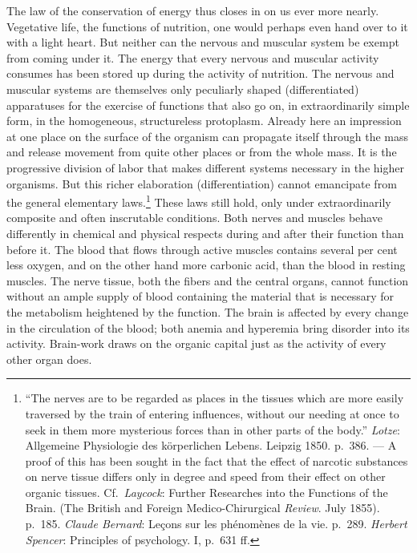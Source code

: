 \documentclass[12pt,a4paper]{book}
\newcommand{\opage}[1]{\marginnote{\footnotesize\textit{[#1]}}}
\begin{document}
The law of the conservation of energy thus closes in on us ever more
nearly. Vegetative life, the functions of nutrition, one would perhaps
even hand over to it with a light heart. But neither can the nervous and
muscular system be exempt from coming under it. The energy that every
nervous and muscular activity consumes has been stored up during the
activity of nutrition. The nervous and muscular systems are themselves
only peculiarly shaped (differentiated) apparatuses for the exercise of
functions that also go on, in extraordinarily simple form, in the
homogeneous, structureless protoplasm. Already here an impression at
one place on the surface of the organism can propagate itself through
the mass and release movement from quite other places or from the whole
mass. It is the progressive division of labor that makes different
systems necessary in the higher organisms. But this richer elaboration
(differentiation) cannot emancipate from the general elementary
laws.\footnote{``The nerves are to be regarded as places in the tissues
which are more easily traversed by the train of entering influences,
without our needing at once to seek in them more mysterious forces than
in other parts of the body.'' \emph{Lotze}: Allgemeine Physiologie des
körperlichen Lebens. Leipzig 1850. p.~386. --- A proof of this has been
sought in the fact that the effect of narcotic substances on nerve
tissue differs only in degree and speed from their effect on other
organic tissues. Cf.\ \emph{Laycock}: Further Researches into the
Functions of the Brain. (The British and Foreign Medico-Chirurgical
\emph{Review}. July 1855). p.~185. \emph{Claude Bernard}: Leçons sur les
phénomènes de la vie. p.~289. \emph{Herbert Spencer}: Principles of
psychology. I, p.~631 ff.} These laws still hold, only under
extraordinarily composite and often inscrutable conditions. Both nerves
and muscles behave differently in chemical and physical respects during
and after their function than before it. The blood that flows through
active muscles contains
\opage{44}several per cent less oxygen, and on the other hand more
carbonic acid, than the blood in resting muscles. The nerve tissue, both
the fibers and the central organs, cannot function without an ample
supply of blood containing the material that is necessary for the
metabolism heightened by the function. The brain is affected by every
change in the circulation of the blood; both anemia and hyperemia bring
disorder into its activity. Brain-work draws on the organic capital just
as the activity of every other organ does.
\end{document}
